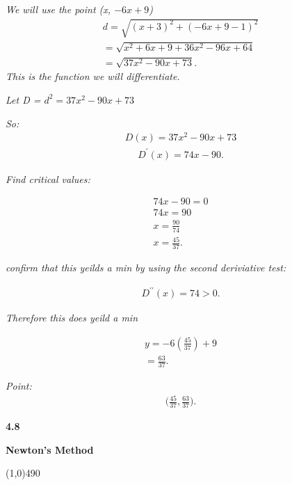 \documentclass{report}
\begin{document}
 \bigbreak \noindent 
 \textit{We will use the point (x, $-6x+9 $)}
 \begin{align*}
   d =\sqrt{(x+3)^{2} + (-6x+9-1)^{2}} \\
   = \sqrt{x^{2}+6x+9 +36x^{2}-96x+64} \\
   = \sqrt{37x^{2}-90x + 73}
 .\end{align*}
 \bigbreak \noindent 
 \textit{This is the function we will differentiate.}

 \bigbreak \noindent 
 \textit{Let D = $d^{2} = 37x^{2}-90x+73$}

 \bigbreak \noindent 

  \bigbreak \noindent
  \textit{So:}
  \begin{align*}
    D(x) = 37x^{2}-90x+73    
  \end{align*}
  \begin{align*}
    D^{\prime}(x) = 74x - 90
  .\end{align*}

  \bigbreak \noindent 
  \textit{Find critical values:}

  \begin{align*}
    74x-90 = 0 \\
    74x = 90 \\
    x = \frac{90}{74} \\
    x= \frac{45}{37}
  .\end{align*}

  \bigbreak \noindent 
  \textit{confirm that this yeilds a min by using the second deriviative test:}

  \begin{align*}
    D^{\prime\prime}(x) = 74 > 0 
  .\end{align*}

  \bigbreak \noindent 
  \textit{Therefore this does yeild a min}

  \begin{align*}
    y = -6(\frac{45}{37}) + 9 \\
    = \frac{63}{37}
  .\end{align*}

  \bigbreak \noindent 
  \textit{Point:}
  \begin{align*}
    \bigg(\frac{45}{37}, \frac{63}{37}\bigg)
  .\end{align*}

  \pagebreak \bigbreak \noindent
  \begin{Large}
      \begin{mdframed}
          \begin{center}
              \textbf{4.8}
          \end{center}
      \end{mdframed}
  \end{Large}
  \begin{Large}
      \begin{center}
          \textbf{Newton's Method}
      \end{center}
  \end{Large}
  \line(1,0){490}
  
\end{document}
